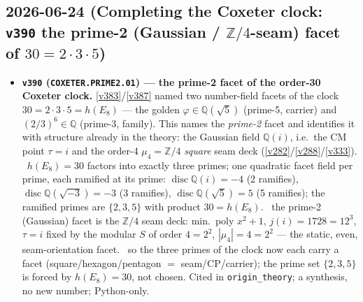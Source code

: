 \subsection*{2026-06-24 (Completing the Coxeter clock: \texttt{v390} the prime-2 (Gaussian / $\mathbb Z/4$-seam) facet of $30=2{\cdot}3{\cdot}5$)}
\begin{itemize}
\item \textbf{\texttt{v390} (\texttt{COXETER.PRIME2.01}) --- the prime-2 facet of the order-30 Coxeter clock.}
\vref{v383}/\vref{v387} named two number-field facets of the clock $30=2{\cdot}3{\cdot}5=h(E_8)$ --- the golden
$\varphi\in\mathbb Q(\sqrt5)$ (prime-5, carrier) and $(2/3)^6\in\mathbb Q$ (prime-3, family). This names the
\emph{prime-2} facet and identifies it with structure already in the theory: the Gaussian field $\mathbb Q(i)$, i.e.\
the CM point $\tau=i$ and the order-4 $\mu_4=\mathbb Z/4$ \emph{square} seam deck (\vref{v282}/\vref{v288}/\vref{v333}).
\mE\ $h(E_8)=30$ factors into exactly three primes; one quadratic facet field per prime, each ramified at its prime:
$\operatorname{disc}\mathbb Q(i)=-4$ (2 ramifies), $\operatorname{disc}\mathbb Q(\sqrt{-3})=-3$ (3 ramifies),
$\operatorname{disc}\mathbb Q(\sqrt5)=5$ (5 ramifies); the ramified primes are $\{2,3,5\}$ with product $30=h(E_8)$.
\mE\ the prime-2 (Gaussian) facet is the $\mathbb Z/4$ seam deck: min.\ poly $x^2+1$, $j(i)=1728=12^3$, $\tau=i$ fixed by
the modular $S$ of order $4=2^2$, $|\mu_4|=4=2^2$ --- the static, even, seam-orientation facet. \mC\ so the three primes
of the clock now each carry a facet (square/hexagon/pentagon $=$ seam/CP/carrier); the prime set $\{2,3,5\}$ is forced by
$h(E_8)=30$, not chosen. Cited in \texttt{origin\_theory}; a synthesis, no new number; Python-only.
\end{itemize}

